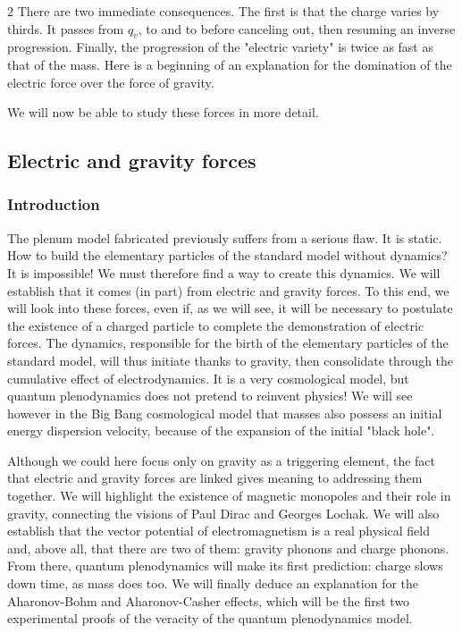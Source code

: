 \begin{multicols}{2}
	There are two immediate consequences. The first is that the charge varies 
	by thirds. It passes from $q_v$, to  and to  before 
	canceling out, then resuming an inverse progression. Finally, the 
	progression of the "electric variety" is twice as fast as that of the 
	mass. Here is a beginning of an explanation for the domination of the 
	electric force over the force of gravity.
	
	We will now be able to study these forces in more detail.
	
	
	\subsection{Electric and gravity forces}
	
	\subsubsection{Introduction}
	
	The plenum model fabricated previously suffers from a serious flaw. It is 
	static. How to build the elementary particles of the standard model 
	without dynamics? It is impossible! We must therefore find a way to 
	create this dynamics. We will establish that it comes (in part) from 
	electric and gravity forces. To this end, we will look into these 
	forces, even if, as we will see, it will be necessary to postulate the 
	existence of a charged particle to complete the demonstration of electric 
	forces. The dynamics, responsible for the birth of the elementary 
	particles of the standard model, will thus initiate thanks to gravity, 
	then consolidate through the cumulative effect of electrodynamics. It 
	is a very cosmological model, but quantum plenodynamics does not 
	pretend to reinvent physics! We will see however in the Big Bang 
	cosmological model that masses also possess an initial energy dispersion 
	velocity, because of the expansion of the initial "black hole".
	
	Although we could here focus only on gravity as a triggering element, the 
	fact that electric and gravity forces are linked gives meaning to 
	addressing them together. We will highlight the existence of magnetic 
	monopoles and their role in gravity, connecting the visions of Paul 
	Dirac and Georges Lochak. We will also establish that the vector 
	potential of electromagnetism is a real physical field and, above all, 
	that there are two of them: gravity phonons and charge phonons. From there, 
	quantum plenodynamics will make its first prediction: charge slows 
	down time, as mass does too. We will finally deduce an explanation for 
	the Aharonov-Bohm and Aharonov-Casher effects, which will be the first 
	two experimental proofs of the veracity of the quantum plenodynamics 
	model.
	

\end{multicols}
